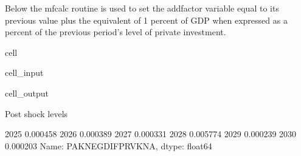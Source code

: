 \documentclass[letterpaper,10pt,english]{jupyterBook}
\begin{document}
\sphinxAtStartPar
Below the mfcalc routine is used to set the addfactor variable equal to its previous value plus the equivalent of 1 percent of GDP when expressed as a percent of the previous period’s level of private investment.

\begin{sphinxuseclass}{cell}\begin{sphinxVerbatimInput}

\begin{sphinxuseclass}{cell_input}
\begin{sphinxVerbatim}[commandchars=\\\{\}]

\PYG{p}{[}\PYG{p}{]}
\end{sphinxVerbatim}

\end{sphinxuseclass}\end{sphinxVerbatimInput}
\begin{sphinxVerbatimOutput}

\begin{sphinxuseclass}{cell_output}
\begin{sphinxVerbatim}[commandchars=\\\{\}]
Post shock levels
\end{sphinxVerbatim}

\begin{sphinxVerbatim}[commandchars=\\\{\}]
2025   \PYGZhy{}0.000458
2026   \PYGZhy{}0.000389
2027   \PYGZhy{}0.000331
2028    0.005774
2029   \PYGZhy{}0.000239
2030   \PYGZhy{}0.000203
Name: PAKNEGDIFPRVKN\PYGZus{}A, dtype: float64
\end{sphinxVerbatim}

\end{sphinxuseclass}\end{sphinxVerbatimOutput}

\end{sphinxuseclass}
\end{document}

